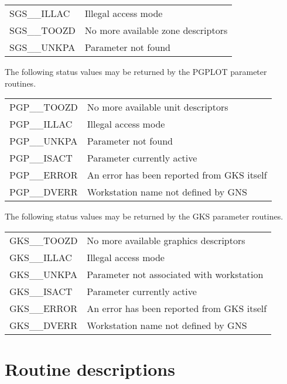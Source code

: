 \begin{tabular}{ll}
SGS\_\_ILLAC     & Illegal access mode \\
SGS\_\_TOOZD     & No more available zone descriptors \\
SGS\_\_UNKPA     & Parameter not found \\
\end{tabular}

The following status values may be returned by the PGPLOT parameter
routines.

\begin{tabular}{ll}
PGP\_\_TOOZD     & No more available unit descriptors \\
PGP\_\_ILLAC     & Illegal access mode \\
PGP\_\_UNKPA     & Parameter not found \\
PGP\_\_ISACT     & Parameter currently active \\
PGP\_\_ERROR     & An error has been reported from GKS itself \\
PGP\_\_DVERR     & Workstation name not defined by GNS
\end{tabular}

The following status values may be returned by the GKS parameter
routines.

\begin{tabular}{ll}
GKS\_\_TOOZD     & No more available graphics descriptors \\
GKS\_\_ILLAC     & Illegal access mode \\
GKS\_\_UNKPA     & Parameter not associated with workstation \\
GKS\_\_ISACT     & Parameter currently active \\
GKS\_\_ERROR     & An error has been reported from GKS itself \\
GKS\_\_DVERR     & Workstation name not defined by GNS
\end{tabular}
\newpage

\section{Routine descriptions}

